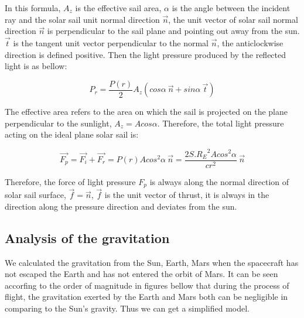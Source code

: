 \documentclass[../Paper.tex]{subfiles}
\begin{document}
In this formula, $A_z$ is the effective sail area, $\alpha$ is the angle between the incident ray and the solar sail unit normal direction $\vec{n}$, the unit vector of solar sail normal direction $\vec{n}$ is perpendicular to the sail plane and pointing out away from the sun. $\vec{t}$ is the tangent unit vector perpendicular to the normal $\vec{n}$, the anticlockwise direction is defined positive. Then the light pressure produced by the reflected light is as bellow:

\begin{equation}
P_r=\frac{P(r)}{2}A_z(cos\alpha~\vec{n}+sin\alpha~\vec{t})
\label{eq:2}
\end{equation}

The effective area refers to the area on which the sail is projected on the plane perpendicular to the sunlight, $A_z=Acos\alpha$. Therefore, the total light pressure acting on the ideal plane solar sail is:

\begin{equation}	
\vec{F_p}=\vec{F_i}+\vec{F_r}=P(r)Acos^2\alpha~\vec{n}=\dfrac{2S.{R_E}^2Acos^2\alpha}{cr^2}~\vec{n}
\label{eq:3}
\end{equation}

Therefore, the force of light pressure $F_p$ is always along the normal direction of solar sail surface, $\vec{f}=\vec{n}$, $\vec{f}$ is the unit vector of thrust, it is always in the direction along the pressure direction and deviates from the sun.

\subsection{Analysis of the gravitation}

We calculated the gravitation from the Sun, Earth, Mars when the spacecraft has not escaped the Earth and has not entered the orbit of Mars. It can be seen accorfing to the order of magnitude in figures bellow that during the process of flight, the gravitation exerted by the Earth and Mars both can be negligible in comparing to the Sun's gravity. Thus we can get a simplified model. 

\end{document}
